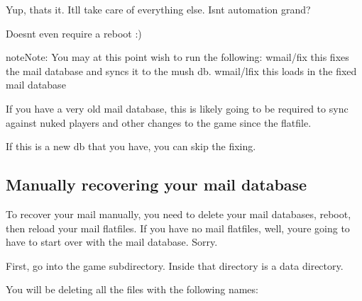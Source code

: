 \documentclass[letterpaper,10pt,english]{sphinxmanual}
\begin{document}
\sphinxAtStartPar
Yup, that\textquotesingle{}s it.  It\textquotesingle{}ll take care of everything else.  Isn\textquotesingle{}t automation grand?

\sphinxAtStartPar
Doesn\textquotesingle{}t even require a reboot :)

\begin{sphinxadmonition}{note}{Note:}
\sphinxAtStartPar
You may at this point wish to run the following:
wmail/fix  \sphinxhyphen{}\sphinxhyphen{} this fixes the mail database and sync\textquotesingle{}s it to the mush db.
wmail/lfix \sphinxhyphen{}\sphinxhyphen{} this loads in the fixed mail database
\end{sphinxadmonition}

\sphinxAtStartPar
If you have a very old mail database, this is likely going to be required
to sync against nuked players and other changes to the game since the flatfile.

\sphinxAtStartPar
If this is a new db that you have, you can skip the fixing.


\subsection{Manually recovering your mail database}
\label{\detokenize{troubleshooting:manually-recovering-your-mail-database}}
\sphinxAtStartPar
To recover your mail manually, you need to delete your mail databases,
reboot, then reload your mail flatfiles.  If you have no mail flatfiles,
well, you\textquotesingle{}re going to have to start over with the mail database.  Sorry.

\sphinxAtStartPar
First, go into the \textquotesingle{}game\textquotesingle{} subdirectory.  Inside that directory is a \textquotesingle{}data\textquotesingle{}
directory.

\sphinxAtStartPar
You will be deleting all the files with the following names:

\begin{sphinxVerbatim}[commandchars=\\\{\}]
                 
               
\end{sphinxVerbatim}
\end{document}
